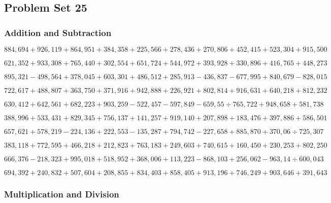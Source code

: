 \hypertarget{problem-set-25-5}{%
\subsection{Problem Set 25}\label{problem-set-25-5}}

\hypertarget{addition-and-subtraction-330}{%
\subsubsection{Addition and
Subtraction}\label{addition-and-subtraction-330}}

\(884,694+926,119+864,951+384,358+225,566+278,436+270,806+452,415+523,304+ 915,500\)

\(621,352+933,308+765,440+302,554+651,724+544,972+393,928+330,896+416,765+448,273\)

\(895,321-498,564+378,045+603,301+486,512+285,913-436,837-677,995+840,679-828,015\)

\(722,617+488,807+363,750+371,916+942,888+226,921+802,814+916,631+640,218+812,232\)

\(630,412+642,561+682,223+903,259-522,457-597,849-659,55÷765,722+948,658+581,738\)

\(388,996+533,431+829,345+756,137+141,257+919,140+207,898+183,476+397,886+586,501\)

\(657,621+578,219-224,136+222,553-135,287+794,742-227,658+885,870+370,06÷725,307\)

\(383,118+772,595+466,218+212,823+763,183+249,603+740,615+160,450+230,253+802,250\)

\(666,376-218,323+995,018+518,952+368,006+113,223-868,103+256,062-963,14÷600,043\)

\(694,392+240,832+507,604+208,855+834,403+858,405+913,196+746,249+903,646+391,643\)

\hypertarget{multiplication-and-division-329}{%
\subsubsection{Multiplication and
Division}\label{multiplication-and-division-329}}

